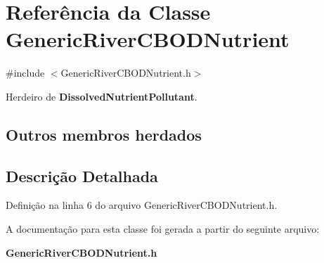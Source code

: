 \section{Referência da Classe Generic\+River\+C\+B\+O\+D\+Nutrient}
\label{class_generic_river_c_b_o_d_nutrient}


{\ttfamily \#include $<$Generic\+River\+C\+B\+O\+D\+Nutrient.\+h$>$}



Herdeiro de {\bf Dissolved\+Nutrient\+Pollutant}.

\subsection*{Outros membros herdados}


\subsection{Descrição Detalhada}


Definição na linha 6 do arquivo Generic\+River\+C\+B\+O\+D\+Nutrient.\+h.



A documentação para esta classe foi gerada a partir do seguinte arquivo\+:\begin{DoxyCompactItemize}
\item 
{\bf Generic\+River\+C\+B\+O\+D\+Nutrient.\+h}\end{DoxyCompactItemize}

